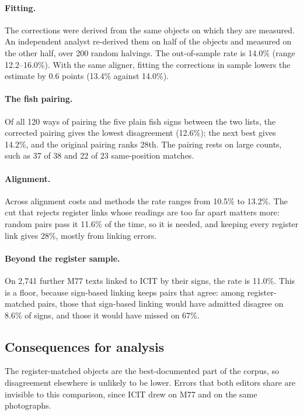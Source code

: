 \documentclass[11pt,a4paper]{article}
\begin{document}
\paragraph{Fitting.} The corrections were derived from the same objects on which they are measured. An independent analyst re-derived them on half of the objects and measured on the other half, over 200 random halvings. The out-of-sample rate is 14.0\% (range 12.2--16.0\%). With the same aligner, fitting the corrections in sample lowers the estimate by 0.6 points (13.4\% against 14.0\%).

\paragraph{The fish pairing.} Of all 120 ways of pairing the five plain fish signs between the two lists, the corrected pairing gives the lowest disagreement (12.6\%); the next best gives 14.2\%, and the original pairing ranks 28th. The pairing rests on large counts, such as 37 of 38 and 22 of 23 same-position matches.

\paragraph{Alignment.} Across alignment costs and methods the rate ranges from 10.5\% to 13.2\%. The cut that rejects register links whose readings are too far apart matters more: random pairs pass it 11.6\% of the time, so it is needed, and keeping every register link gives 28\%, mostly from linking errors.

\paragraph{Beyond the register sample.} On 2,741 further M77 texts linked to ICIT by their signs, the rate is 11.0\%. This is a floor, because sign-based linking keeps pairs that agree: among register-matched pairs, those that sign-based linking would have admitted disagree on 8.6\% of signs, and those it would have missed on 67\%.

\subsection{Consequences for analysis}

The register-matched objects are the best-documented part of the corpus, so disagreement elsewhere is unlikely to be lower. Errors that both editors share are invisible to this comparison, since ICIT drew on M77 and on the same photographs.
\end{document}
